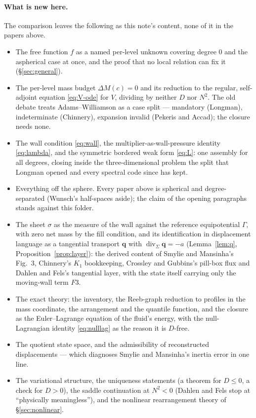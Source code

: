 \documentclass[11pt]{article}
\theoremstyle{definition}
\theoremstyle{remark}
\newcommand{\bq}{\mathbf{q}}
\newcommand{\divS}{\operatorname{div}_\Sigma}
\begin{document}
\paragraph{What is new here.} The comparison leaves the following as
this note's content, none of it in the papers above.
\begin{itemize}
\item The free function $f$ as a named per-level unknown covering
  degree 0 and the aspherical case at once, and the proof that no
  local relation can fix it (\S\ref{sec:general}).
\item The per-level mass budget $\Delta M(c) = 0$ and its reduction to
  the regular, self-adjoint equation \eqref{eq:V-ode} for $V$,
  dividing by neither $D$ nor $N^2$. The old debate treats
  Adams--Williamson as a case split --- mandatory (Longman),
  indeterminate (Chinnery), expansion invalid (Pekeris and Accad); the
  closure needs none.
\item The wall condition \eqref{eq:wall}, the multiplier-as-wall-pressure
  identity \eqref{eq:lambda}, and the symmetric bordered weak form
  \eqref{eq:L}: one assembly for all degrees, closing inside the
  three-dimensional problem the split that Longman opened and every
  spectral code since has kept.
\item Everything off the sphere. Every paper above is spherical and
  degree-separated (Wunsch's half-spaces aside); the claim of the
  opening paragraphs stands against this folder.
\item The sheet $\sigma$ as the measure of the wall against the
  reference equipotential $\Gamma$, with zero net mass by the fill
  condition, and its identification in displacement language as a
  tangential transport $\bq$ with $\divS\bq = -a$
  (Lemma~\ref{lem:q}, Proposition~\ref{prop:layer}): the derived
  content of Smylie and Mansinha's Fig.~3, Chinnery's $K_1$
  bookkeeping, Crossley and Gubbins's pill-box flux and Dahlen and
  Fels's tangential layer, with the state itself carrying only the
  moving-wall term $F3$.
\item The exact theory: the inventory, the Reeb-graph reduction to
  profiles in the mass coordinate, the arrangement and the quantile
  function, and the closure as the Euler--Lagrange equation of the
  fluid's energy, with the null-Lagrangian identity \eqref{eq:nulllag}
  as the reason it is $D$-free.
\item The quotient state space, and the admissibility of reconstructed
  displacements --- which diagnoses Smylie and Mansinha's inertia
  error in one line.
\item The variational structure, the uniqueness statements (a theorem
  for $D \le 0$, a check for $D > 0$), the saddle
  continuation at $N^2 < 0$ (Dahlen and Fels stop at ``physically
  meaningless''), and the nonlinear rearrangement theory of
  \S\ref{sec:nonlinear}.
\end{itemize}
\end{document}
